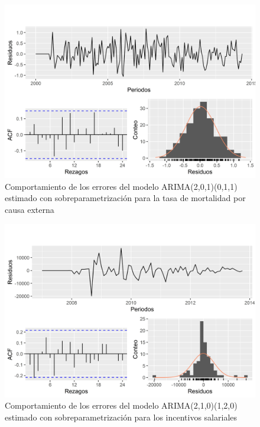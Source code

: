 \documentclass[
]{article}
\begin{document}
\begin{figure}[H]
\includegraphics[width=1\linewidth,height=1\textheight]{Tesis_files/figure-latex/errores_reales_sobreparametrizacion2-1} \caption{Comportamiento de los errores del modelo ARIMA(2,0,1)(0,1,1) estimado con sobreparametrización para la tasa de mortalidad por causa externa}\label{fig:errores_reales_sobreparametrizacion2}
\end{figure}

\begin{figure}[H]
\includegraphics[width=1\linewidth,height=1\textheight]{Tesis_files/figure-latex/errores_reales_sobreparametrizacion3-1} \caption{Comportamiento de los errores del modelo ARIMA(2,1,0)(1,2,0) estimado con sobreparametrización para los incentivos salariales}\label{fig:errores_reales_sobreparametrizacion3}
\end{figure}
\end{document}
